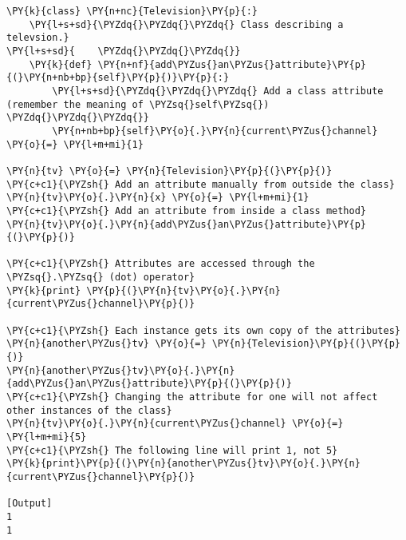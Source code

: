\begin{Verbatim}[label=\makebox{\url{https://github.com/lucabaldini/cmepda/tree/master/slides/latex/snippets/class\_attributes\_1.py}},commandchars=\\\{\}]
\PY{k}{class} \PY{n+nc}{Television}\PY{p}{:}
    \PY{l+s+sd}{\PYZdq{}\PYZdq{}\PYZdq{} Class describing a televsion.}
\PY{l+s+sd}{    \PYZdq{}\PYZdq{}\PYZdq{}}
    \PY{k}{def} \PY{n+nf}{add\PYZus{}an\PYZus{}attribute}\PY{p}{(}\PY{n+nb+bp}{self}\PY{p}{)}\PY{p}{:}
        \PY{l+s+sd}{\PYZdq{}\PYZdq{}\PYZdq{} Add a class attribute (remember the meaning of \PYZsq{}self\PYZsq{}) \PYZdq{}\PYZdq{}\PYZdq{}}
        \PY{n+nb+bp}{self}\PY{o}{.}\PY{n}{current\PYZus{}channel} \PY{o}{=} \PY{l+m+mi}{1}

\PY{n}{tv} \PY{o}{=} \PY{n}{Television}\PY{p}{(}\PY{p}{)}
\PY{c+c1}{\PYZsh{} Add an attribute manually from outside the class}
\PY{n}{tv}\PY{o}{.}\PY{n}{x} \PY{o}{=} \PY{l+m+mi}{1}
\PY{c+c1}{\PYZsh{} Add an attribute from inside a class method}
\PY{n}{tv}\PY{o}{.}\PY{n}{add\PYZus{}an\PYZus{}attribute}\PY{p}{(}\PY{p}{)}

\PY{c+c1}{\PYZsh{} Attributes are accessed through the \PYZsq{}.\PYZsq{} (dot) operator}
\PY{k}{print} \PY{p}{(}\PY{n}{tv}\PY{o}{.}\PY{n}{current\PYZus{}channel}\PY{p}{)}

\PY{c+c1}{\PYZsh{} Each instance gets its own copy of the attributes}
\PY{n}{another\PYZus{}tv} \PY{o}{=} \PY{n}{Television}\PY{p}{(}\PY{p}{)}
\PY{n}{another\PYZus{}tv}\PY{o}{.}\PY{n}{add\PYZus{}an\PYZus{}attribute}\PY{p}{(}\PY{p}{)}
\PY{c+c1}{\PYZsh{} Changing the attribute for one will not affect other instances of the class}
\PY{n}{tv}\PY{o}{.}\PY{n}{current\PYZus{}channel} \PY{o}{=} \PY{l+m+mi}{5}
\PY{c+c1}{\PYZsh{} The following line will print 1, not 5}
\PY{k}{print}\PY{p}{(}\PY{n}{another\PYZus{}tv}\PY{o}{.}\PY{n}{current\PYZus{}channel}\PY{p}{)}

[Output]
1
1
\end{Verbatim}
